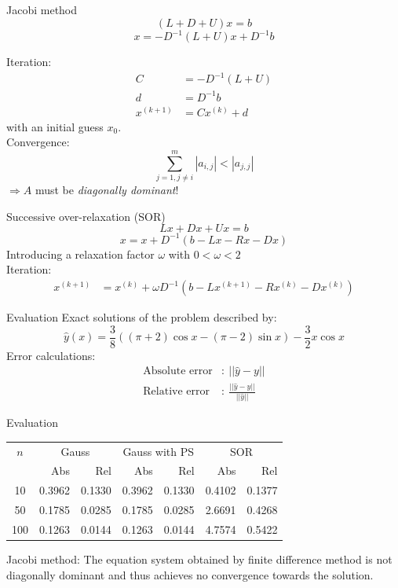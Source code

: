 \documentclass{beamer}
\begin{document}
	\begin{frame}{Jacobi method}
		$$(L + D + U)x = b$$
		$$x = -D^{-1}(L+U)x + D^{-1}b$$
		
		Iteration:
		\begin{align*}
			C &= -D^{-1}(L+U)\\
			d &= D^{-1}b\\
			x^{(k+1)} &= Cx^{(k)} + d
		\end{align*}
		with an initial guess $x_0$.\\
		Convergence:
		$$\sum_{j=1, j\neq i}^{m} |a_{i,j}| < |a_{j,j}|$$ 
		$\Rightarrow A$ must be \textit{diagonally dominant}!
	\end{frame}
	
	\begin{frame}{Successive over-relaxation (SOR)}
		$$Lx + Dx + Ux = b$$
		$$x = x + D^{-1}(b-Lx-Rx-Dx)$$
		Introducing a relaxation factor $\omega$ with $0<\omega<2 $ \\
		Iteration:
		\begin{align*}
			x^{(k+1)} &= x^{(k)} + \omega D^{-1}(b - Lx^{(k+1)} - Rx^{(k)} - D x^{(k)})
		\end{align*}
	\end{frame}
	
	\begin{frame}{Evaluation}
		Exact solutions of the problem described by: 
		\begin{equation*}
			\hat{y}(x)= \frac{3}{8}\left(\left(\pi+2\right)\cos x - \left(\pi - 2\right)\sin x\right) - \frac{3}{2}x\cos x
		\end{equation*}
		Error calculations:
		\begin{align*}
			\text{Absolute error}&:\ ||\hat{y} - y||\\
			\text{Relative error}&:\ \frac{||\hat{y} - y||}{||\hat{y}||}
		\end{align*}
	\end{frame}
	
	\begin{frame}{Evaluation}
		\begin{table}
			\begin{tabular}{c| r r r r r r}
				\toprule
				$n$ & \multicolumn{2}{c}{Gauss} & \multicolumn{2}{c}{Gauss with PS} & \multicolumn{2}{c}{SOR}\\
				 & Abs & Rel & Abs & Rel & Abs & Rel \\
				\midrule
				10 & 0.3962 & 0.1330 & 0.3962 & 0.1330 & 0.4102 & 0.1377 \\
				50 & 0.1785 & 0.0285 & 0.1785 & 0.0285 & 2.6691 & 0.4268\\
				100 & 0.1263 & 0.0144 & 0.1263 & 0.0144 & 4.7574 & 0.5422\\
				\bottomrule			
			\end{tabular}
		\end{table}
		
		Jacobi method: The equation system obtained by finite difference method is not diagonally dominant and thus achieves no convergence towards the solution. 
	\end{frame}
	
\end{document}
